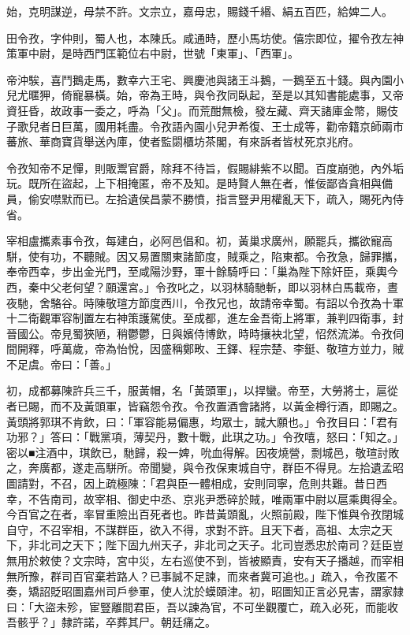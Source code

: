 \begin{pinyinscope}
 始，克明謀逆，母禁不許。文宗立，嘉母忠，賜錢千緡、絹五百匹，給婢二人。



 田令孜，字仲則，蜀人也，本陳氏。咸通時，歷小馬坊使。僖宗即位，擢令孜左神策軍中尉，是時西門匡範位右中尉，世號「東軍」、「西軍」。



 帝沖騃，喜鬥鵝走馬，數幸六王宅、興慶池與諸王斗鵝，一鵝至五十錢。與內園小兒尤暱狎，倚寵暴橫。始，帝為王時，與令孜同臥起，至是以其知書能處事，又帝資狂昏，故政事一委之，呼為「父」。而荒酣無檢，發左藏、齊天諸庫金幣，賜伎子歌兒者日巨萬，國用耗盡。令孜語內園小兒尹希復、王士成等，勸帝籍京師兩市蕃旅、華商寶貨舉送內庫，使者監閟櫃坊茶閣，有來訴者皆杖死京兆府。



 令孜知帝不足憚，則販鬻官爵，除拜不待旨，假賜緋紫不以聞。百度崩弛，內外垢玩。既所在盜起，上下相掩匿，帝不及知。是時賢人無在者，惟佞鄙沓貪相與備員，偷安噤默而已。左拾遺侯昌蒙不勝憤，指言豎尹用權亂天下，疏入，賜死內侍省。



 宰相盧攜素事令孜，每建白，必阿邑倡和。初，黃巢求廣州，願罷兵，攜欲寵高駢，使有功，不聽賊。因又易置關東諸節度，賊乘之，陷東都。令孜急，歸罪攜，奉帝西幸，步出金光門，至咸陽沙野，軍十餘騎呼曰：「巢為陛下除奸臣，乘輿今西，秦中父老何望？願還宮。」令孜叱之，以羽林騎馳斬，即以羽林白馬載帝，晝夜馳，舍駱谷。時陳敬瑄方節度西川，令孜兄也，故請帝幸蜀。有詔以令孜為十軍十二衛觀軍容制置左右神策護駕使。至成都，進左金吾衛上將軍，兼判四衛事，封晉國公。帝見蜀狹陋，稍鬱鬱，日與嬪侍博飲，時時攘袂北望，怊然流涕。令孜伺間開釋，呼萬歲，帝為怡悅，因盛稱鄭畋、王鐸、程宗楚、李鋌、敬瑄方並力，賊不足虞。帝曰：「善。」



 初，成都募陳許兵三千，服黃帽，名「黃頭軍」，以捍蠻。帝至，大勞將士，扈從者已賜，而不及黃頭軍，皆竊怨令孜。令孜置酒會諸將，以黃金樽行酒，即賜之。黃頭將郭琪不肯飲，曰：「軍容能易偏惠，均眾士，誠大願也。」令孜目曰：「君有功邪？」答曰：「戰黨項，薄契丹，數十戰，此琪之功。」令孜嘻，怒曰：「知之。」密以■注酒中，琪飲已，馳歸，殺一婢，吮血得解。因夜燒營，剽城邑，敬瑄討敗之，奔廣都，遂走高駢所。帝聞變，與令孜保東城自守，群臣不得見。左拾遺孟昭圖請對，不召，因上疏極陳：「君與臣一體相成，安則同寧，危則共難。昔日西幸，不告南司，故宰相、御史中丞、京兆尹悉碎於賊，唯兩軍中尉以扈乘輿得全。今百官之在者，率冒重險出百死者也。昨昔黃頭亂，火照前殿，陛下惟與令孜閉城自守，不召宰相，不謀群臣，欲入不得，求對不許。且天下者，高祖、太宗之天下，非北司之天下；陛下固九州天子，非北司之天子。北司豈悉忠於南司？廷臣豈無用於敕使？文宗時，宮中災，左右巡使不到，皆被顯責，安有天子播越，而宰相無所豫，群司百官棄若路人？已事誠不足諫，而來者冀可追也。」疏入，令孜匿不奏，矯詔貶昭圖嘉州司戶參軍，使人沈於蟆頤津。初，昭圖知正言必見害，謂家隸曰：「大盜未殄，宦豎離間君臣，吾以諫為官，不可坐觀覆亡，疏入必死，而能收吾骸乎？」隸許諾，卒葬其尸。朝廷痛之。




\end{pinyinscope}
